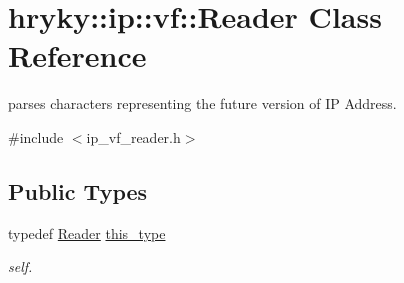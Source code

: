 \hypertarget{classhryky_1_1ip_1_1vf_1_1_reader}{\section{hryky\-:\-:ip\-:\-:vf\-:\-:Reader Class Reference}
\label{classhryky_1_1ip_1_1vf_1_1_reader}
}


parses characters representing the future version of I\-P Address.  




{\ttfamily \#include $<$ip\-\_\-vf\-\_\-reader.\-h$>$}

\subsection*{Public Types}
\begin{DoxyCompactItemize}
\item 
\hypertarget{classhryky_1_1ip_1_1vf_1_1_reader_a6a4fdf2ae2b33a48f43ae2aafaa93e12}{typedef \hyperlink{classhryky_1_1ip_1_1vf_1_1_reader}{Reader} \hyperlink{classhryky_1_1ip_1_1vf_1_1_reader_a6a4fdf2ae2b33a48f43ae2aafaa93e12}{this\-\_\-type}}\label{classhryky_1_1ip_1_1vf_1_1_reader_a6a4fdf2ae2b33a48f43ae2aafaa93e12}

\begin{DoxyCompactList}\small\item\em self. \end{DoxyCompactList}\end{DoxyCompactItemize}
